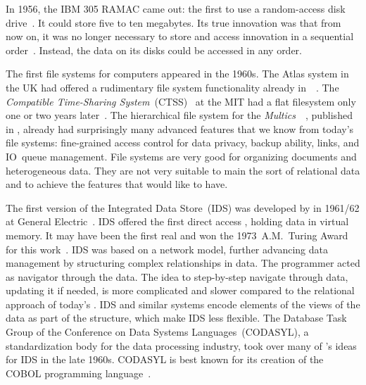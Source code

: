 In 1956, the IBM 305 RAMAC came out: the first to use a random-access disk drive~\cite{IRTFRADDRHBUCASTSFEFSFTE}.
It could store five to ten megabytes.
Its true innovation was that from now on, it was no longer necessary to store and access innovation in a sequential order~\cite{C20245YOQ}.
Instead, the data on its disks could be accessed in any order.

The first file systems for computers appeared in the 1960s.
The Atlas system in the UK had offered a rudimentary file system functionality already in~\citeyear{KPH1961TAS}~\cite{KPH1961TAS}.
The  \emph{Compatible Time-Sharing System}~(CTSS)~\cite{CMDDCHOK1963TCTSSAPG} at the MIT had a flat filesystem only one or two years later~\cite{OD1963TCCSLABTCDE}.
The hierarchical file system for the \emph{Multics}~~\cite{CV1965IAOOTMS}, published in \citeyear{DN1965AGPFSFSS}, already had surprisingly many advanced features that we know from today's file systems: fine-grained access control for data privacy, backup ability, links, and IO~queue management.
File systems are very good for organizing documents and heterogeneous data.
They are not very suitable to main the sort of relational data and to achieve the features that would like  to have.

The first version of the Integrated Data Store~(IDS) was developed by \citeauthor{B2009TOOTIDSITFDAD} in 1961/62 at General Electric~\cite{B2009TOOTIDSITFDAD,B1965SFRAP}.
IDS offered the first direct access , holding data in virtual memory.
It may have been the first real  and \citeauthor{B2009TOOTIDSITFDAD} won the 1973~A.M.~Turing Award for this work~\cite{H2016HCBITDAFOODW}.
IDS was based on a network model, further advancing data management by structuring complex relationships in data.
The programmer acted as navigator through the data.
The idea to step-by-step navigate through data, updating it if needed, is more complicated and slower compared to the relational approach of today's .
IDS and similar systems encode elements of the views of the data as part of the  structure, which make IDS less flexible.
The Database Task Group of the Conference on Data Systems Languages~(CODASYL), a standardization body for the data processing industry, took over many of \citeauthor{B2009TOOTIDSITFDAD}'s ideas for IDS in the late 1960s.
CODASYL is best known for its creation of the COBOL programming language~\cite{H2016HCBITDAFOODW}.

